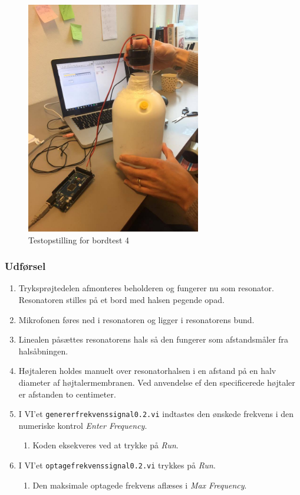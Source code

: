 {		\begin{figure}[htb]
			\centering
				\includegraphics[width=3in]{bordtest4}
				\caption{Testopstilling for bordtest 4}	
				\label{fig:bt4}
			\end{figure}
		

		
		\subsubsection{Udførsel}
			
			\begin{enumerate}
				\item Tryksprøjtedelen afmonteres beholderen og fungerer nu som resonator. Resonatoren stilles på et bord med halsen pegende opad. 
				\item Mikrofonen føres ned i resonatoren og ligger i resonatorens bund. 
				\item Linealen påsættes resonatorens hals så den fungerer som afstandsmåler fra halsåbningen.
				\item Højtaleren holdes manuelt over resonatorhalsen i en afstand på en halv diameter af højtalermembranen. Ved anvendelse ef den specificerede højtaler er afstanden to centimeter. 
				\item I VI'et \texttt{genererfrekvenssignal0.2.vi} indtastes den ønskede frekvens i den numeriske kontrol \textit{Enter Frequency}. 
					\begin{enumerate}
						\item Koden eksekveres ved at trykke på \textit{Run}. 
					\end{enumerate} 
				\item I VI'et \texttt{optagefrekvenssignal0.2.vi} trykkes på \textit{Run}. 
					\begin{enumerate}
						\item Den maksimale optagede frekvens aflæses i \textit{Max Frequency}. 
					\end{enumerate}	 	
			\end{enumerate}
			
}

